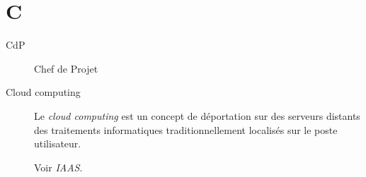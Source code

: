 \section{C}

\begin{description}

\item[CdP] Chef de Projet

\item[Cloud computing]
Le \textsl{cloud computing} est un concept de déportation sur des serveurs distants des traitements informatiques traditionnellement localisés sur le poste utilisateur.

Voir \textsl{IAAS}.

\end{description}
